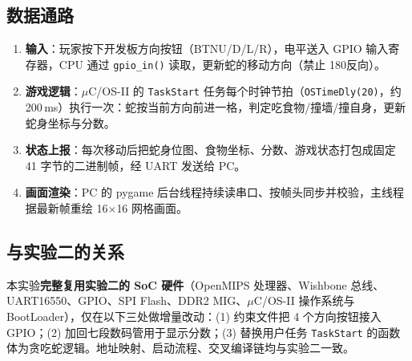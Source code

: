 \subsection{数据通路}

\begin{enumerate}[leftmargin=2em]
    \item \textbf{输入}：玩家按下开发板方向按钮（BTNU/D/L/R），电平送入 GPIO 输入寄存器，CPU 通过 \texttt{gpio\_in()} 读取，更新蛇的移动方向（禁止 180\textdegree 反向）。
    \item \textbf{游戏逻辑}：$\mu$C/OS-II 的 \texttt{TaskStart} 任务每个时钟节拍（\texttt{OSTimeDly(20)}，约 200\,ms）执行一次：蛇按当前方向前进一格，判定吃食物/撞墙/撞自身，更新蛇身坐标与分数。
    \item \textbf{状态上报}：每次移动后把蛇身位图、食物坐标、分数、游戏状态打包成固定 41 字节的二进制帧，经 UART 发送给 PC。
    \item \textbf{画面渲染}：PC 的 pygame 后台线程持续读串口、按帧头同步并校验，主线程据最新帧重绘 16$\times$16 网格画面。
\end{enumerate}

\subsection{与实验二的关系}

本实验\textbf{完整复用实验二的 SoC 硬件}（OpenMIPS 处理器、Wishbone 总线、UART16550、GPIO、SPI Flash、DDR2 MIG、$\mu$C/OS-II 操作系统与 BootLoader），仅在以下三处做增量改动：(1) 约束文件把 4 个方向按钮接入 GPIO；(2) 加回七段数码管用于显示分数；(3) 替换用户任务 \texttt{TaskStart} 的函数体为贪吃蛇逻辑。地址映射、启动流程、交叉编译链均与实验二一致。
